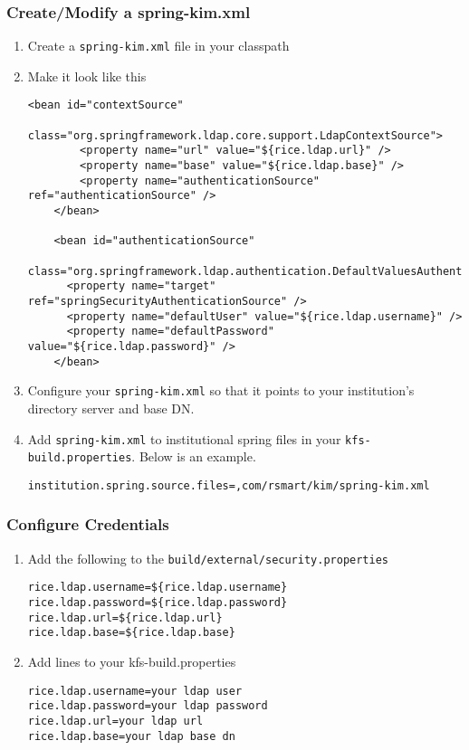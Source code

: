 \documentclass[12pt,notitlepage]{article}
\begin{document}
\subsubsection*{Create/Modify a spring-kim.xml}
\begin{enumerate}
  \item Create a \verb|spring-kim.xml| file in your classpath
  \item Make it look like this
    \begin{lstlisting}[caption=spring-kim.xml]
    <bean id="contextSource"
        class="org.springframework.ldap.core.support.LdapContextSource">
        <property name="url" value="${rice.ldap.url}" />
        <property name="base" value="${rice.ldap.base}" />
        <property name="authenticationSource" ref="authenticationSource" />
    </bean>

    <bean id="authenticationSource"
      class="org.springframework.ldap.authentication.DefaultValuesAuthenticationSourceDecorator">
      <property name="target" ref="springSecurityAuthenticationSource" />
      <property name="defaultUser" value="${rice.ldap.username}" />
      <property name="defaultPassword" value="${rice.ldap.password}" />
    </bean>
    \end{lstlisting}
  \item Configure your \verb|spring-kim.xml| so that it points to your institution's directory server and base DN.
  \item Add \verb|spring-kim.xml| to institutional spring files in your \verb|kfs-build.properties|. Below is an example.
  \begin{lstlisting}[caption=kfs-build.properties]
    institution.spring.source.files=,com/rsmart/kim/spring-kim.xml
  \end{lstlisting}
\end{enumerate}
\subsubsection*{Configure Credentials}
\begin{enumerate}
\item Add the following to the \verb|build/external/security.properties|
    \begin{lstlisting}[caption=build/external/security.properties]
rice.ldap.username=${rice.ldap.username}
rice.ldap.password=${rice.ldap.password}
rice.ldap.url=${rice.ldap.url}
rice.ldap.base=${rice.ldap.base}
\end{lstlisting}
    
    \item Add lines to your kfs-build.properties
    \begin{lstlisting}[caption=kfs-build.properties]
rice.ldap.username=your ldap user
rice.ldap.password=your ldap password
rice.ldap.url=your ldap url
rice.ldap.base=your ldap base dn
\end{lstlisting}
\end{enumerate}
\end{document}
